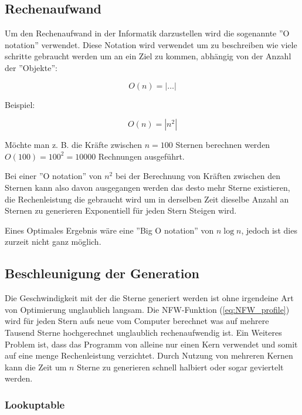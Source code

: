 \subsection{Rechenaufwand} \label{subsec:big_o}

Um den Rechenaufwand in der Informatik darzustellen wird die sogenannte
''O notation'' verwendet. Diese Notation wird verwendet um zu beschreiben
wie viele schritte gebraucht werden um an ein Ziel zu kommen, abhängig von der
Anzahl der ''Objekte'':

\begin{equation}
  O(n) = |\dots|
\end{equation}

Beispiel:

\begin{equation*}
  O(n) = |n^2|
\end{equation*}

Möchte man z. B. die Kräfte zwischen \( n = 100 \) Sternen
berechnen werden \( O(100) = 100^2 = 10000 \) Rechnungen ausgeführt.

Bei einer ''O notation'' von \( n^2 \) bei der Berechnung von
Kräften zwischen den Sternen kann also davon ausgegangen werden das desto
mehr Sterne existieren, die Rechenleistung die gebraucht wird um in derselben
Zeit dieselbe Anzahl an Sternen zu generieren Exponentiell für jeden Stern
Steigen wird.

Eines Optimales Ergebnis wäre eine ''Big O notation'' von \( n\log{n} \),
jedoch ist dies zurzeit nicht ganz möglich.

\subsection{Beschleunigung der Generation} \label{subsec:speeding_things_up}

Die Geschwindigkeit mit der die Sterne generiert werden ist ohne irgendeine Art
von Optimierung unglaublich langsam. Die NFW-Funktion (\ref{eq:NFW_profile})
wird für jeden Stern aufs neue vom Computer berechnet was auf mehrere Tausend
Sterne hochgerechnet unglaublich rechenaufwendig ist.
Ein Weiteres Problem ist, dass das Programm von alleine nur einen Kern
verwendet und somit auf eine menge Rechenleistung verzichtet.
Durch Nutzung von mehreren Kernen kann die Zeit
um \( n \) Sterne zu generieren schnell halbiert oder sogar geviertelt werden.

\subsubsection{Lookuptable} \label{subsec:lookuptable}

